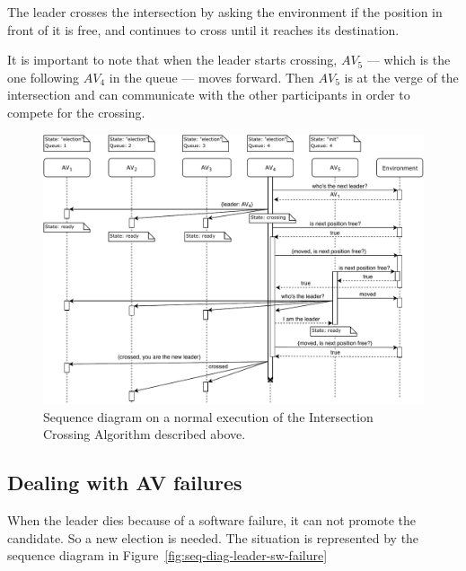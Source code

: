 \documentclass{memoir}
\begin{document}
The leader crosses the intersection by asking the environment if the position in front of it is free, and continues to cross until it reaches its destination.

It is important to note that when the leader starts crossing, $AV_5$ --- which is the one following $AV_4$ in the queue --- moves forward. Then $AV_5$ is at the verge of the intersection and can communicate with the other participants in order to compete for the crossing.

\begin{figure}
	\centering
	\includegraphics[width=\linewidth]{sequence_diagrams/crossing_intersection.pdf}
	\caption{Sequence diagram on a normal execution of the Intersection Crossing Algorithm described above.}
	\label{fig:seq-diag-crossing-intersection}
\end{figure}

\subsection{Dealing with AV failures}

When the leader dies because of a software failure, it can not promote the candidate. So a new election is needed. The situation is represented by the sequence diagram in Figure~\ref{fig:seq-diag-leader-sw-failure}
\end{document}
